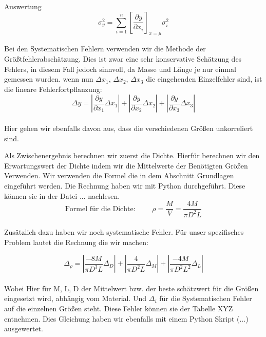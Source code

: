 \documentclass[twoside]{protokoll}
\begin{document}
\begin{aufgabe}{Auswertung}
\begin{equation}
	\sigma_y^2 = \sum_{i=1}^n\left[\frac{\partial y}{\partial x_i}\right]_{x=\mu}\sigma_{i}^2
\end{equation}

Bei den Systematischen Fehlern verwenden wir die Methode der Größtfehlerabschätzung. 
Dies ist zwar eine sehr konservative Schätzung des Fehlers, in diesem Fall jedoch sinnvoll,
da Masse und Länge je nur einmal gemessen wurden. wenn nun $\Delta x_1$, $\Delta x_2$, $\Delta x_3$
die eingehenden Einzelfehler sind, ist die lineare Fehlerfortpflanzung: \\

\begin{equation}
	\Delta y = \left|\frac{\partial y}{\partial x_1}\Delta x_1\right| + 
	\left|\frac{\partial y}{\partial x_2}\Delta x_2\right| + 
	\left|\frac{\partial y}{\partial x_3}\Delta x_3\right|
\end{equation}\\

Hier gehen wir ebenfalls davon aus, dass die verschiedenen Größen unkorreliert sind. 

Als Zwischenergebnis berechnen wir zuerst die Dichte. Hierfür berechnen wir den
Erwartungswert der Dichte indem wir die Mittelwerte der Benötigten Größen Verwenden. 
Wir verwenden die Formel die in dem Abschnitt Grundlagen eingeführt werden. Die Rechnung haben wir mit Python durchgeführt. Diese können sie in der Datei ... nachlesen.\\

\begin{equation}
    \text{Formel für die Dichte: }\qquad \rho = \frac{M}{V} = \frac{4M}{\pi D^2L}
\end{equation}\\

Zusätzlich dazu haben wir noch systematische Fehler. Für unser spezifisches Problem lautet die Rechnung die wir machen:

\begin{equation}
	\Delta_{\rho} = \left|\frac{-8M}{\pi D^3L}\Delta_D\right| + 
	\left|\frac{4}{\pi D^2L}\Delta_M\right| + 
	\left|\frac{-4M}{\pi D^2L^2}\Delta_L\right|
\end{equation}\\

Wobei Hier für M, L, D der Mittelwert bzw. der beste schätzwert für die Größen eingesetzt wird, abhängig 
vom Material. Und $\Delta_i$ für die Systematischen Fehler auf die einzelnen Größen steht. 
Diese Fehler können sie der Tabelle XYZ entnehmen. 
Dies Gleichung haben wir ebenfalls mit einem Python Skript (...)
ausgewertet.


\end{aufgabe}
\end{document}
